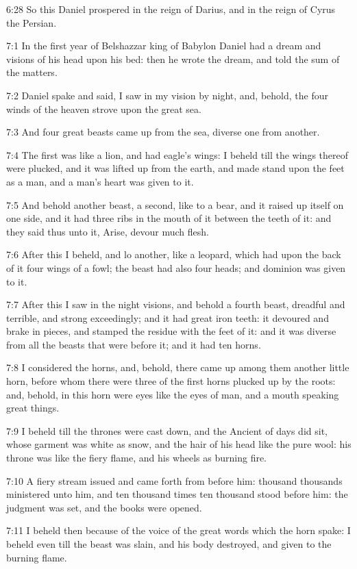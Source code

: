 6:28 So this Daniel prospered in the reign of Darius, and in the reign of Cyrus the Persian.

7:1 In the first year of Belshazzar king of Babylon Daniel had a dream and visions of his head upon his bed: then he wrote the dream, and told the sum of the matters.

7:2 Daniel spake and said, I saw in my vision by night, and, behold, the four winds of the heaven strove upon the great sea.

7:3 And four great beasts came up from the sea, diverse one from another.

7:4 The first was like a lion, and had eagle's wings: I beheld till the wings thereof were plucked, and it was lifted up from the earth, and made stand upon the feet as a man, and a man's heart was given to it.

7:5 And behold another beast, a second, like to a bear, and it raised up itself on one side, and it had three ribs in the mouth of it between the teeth of it: and they said thus unto it, Arise, devour much flesh.

7:6 After this I beheld, and lo another, like a leopard, which had upon the back of it four wings of a fowl; the beast had also four heads; and dominion was given to it.

7:7 After this I saw in the night visions, and behold a fourth beast, dreadful and terrible, and strong exceedingly; and it had great iron teeth: it devoured and brake in pieces, and stamped the residue with the feet of it: and it was diverse from all the beasts that were before it; and it had ten horns.

7:8 I considered the horns, and, behold, there came up among them another little horn, before whom there were three of the first horns plucked up by the roots: and, behold, in this horn were eyes like the eyes of man, and a mouth speaking great things.

7:9 I beheld till the thrones were cast down, and the Ancient of days did sit, whose garment was white as snow, and the hair of his head like the pure wool: his throne was like the fiery flame, and his wheels as burning fire.

7:10 A fiery stream issued and came forth from before him: thousand thousands ministered unto him, and ten thousand times ten thousand stood before him: the judgment was set, and the books were opened.

7:11 I beheld then because of the voice of the great words which the horn spake: I beheld even till the beast was slain, and his body destroyed, and given to the burning flame.

